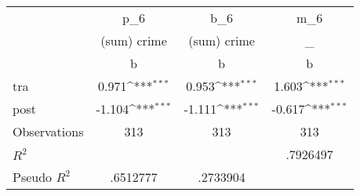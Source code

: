 {
\def\sym#1{\ifmmode^{#1}\else\(^{#1}\)\fi}
\begin{tabular}{l*{3}{c}}
\toprule
                    &         p\_6         &         b\_6         &         m\_6         \\
                    & (sum) crime         & (sum) crime         &           \_         \\
                    &           b         &           b         &           b         \\
\midrule
tra                 &       0.971\sym{***}&       0.953\sym{***}&       1.603\sym{***}\\
post                &      -1.104\sym{***}&      -1.111\sym{***}&      -0.617\sym{***}\\
\midrule
Observations        &         313         &         313         &         313         \\
\(R^{2}\)           &                     &                     &    .7926497         \\
Pseudo \(R^{2}\)    &    .6512777         &    .2733904         &                     \\
\bottomrule
\end{tabular}
}
